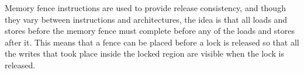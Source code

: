 
Memory fence instructions are used to provide release consistency, and
though they vary between instructions and architectures, the idea is
that all loads and stores before the memory fence must complete before
any of the loads and stores after it. This means that a fence can be
placed before a lock is released so that all the writes that took
place inside the locked region are visible when the lock is released.





{}

